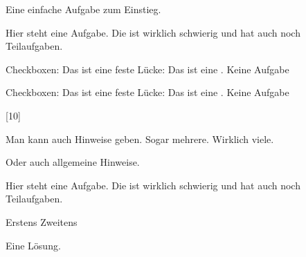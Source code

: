 \documentclass[a4paper]{scrartcl}
\begin{document}
    \begin{aufgabe}[points=2,bonus-points=1]
        Eine einfache Aufgabe zum Einstieg.
    \end{aufgabe}
    \begin{aufgabe}
        Hier steht eine Aufgabe. Die ist wirklich schwierig und hat auch noch Teilaufgaben.
        \begin{teilaufgaben}
            \teilaufgabe Checkboxen: \chb\chb\chb*\chb\chb*
            \teilaufgabe Das ist eine feste Lücke: \luecke[style=\uwave{#1}]{2cm}
            \teilaufgabe Das ist eine .
            \teilaufgabe Keine Aufgabe
        \end{teilaufgaben}
        \begin{loesung}
            \begin{teilaufgaben}
                \teilaufgabe Checkboxen: \chb\chb\chb*\chb\chb*
                \teilaufgabe Das ist eine feste Lücke: \luecke[style=\uwave{#1}]{2cm}
                \teilaufgabe Das ist eine .
                \teilaufgabe Keine Aufgabe
            \end{teilaufgaben}
        \end{loesung}
        [10]
        \begin{bearbeitungshinweis}
            \begin{teilaufgaben}
                \teilaufgabe Man kann auch Hinweise geben.
                \teilaufgabe Sogar mehrere.
                \teilaufgabeOhneLoesung
                \teilaufgabe Wirklich viele.
            \end{teilaufgaben}
            Oder auch allgemeine Hinweise.
        \end{bearbeitungshinweis}
    \end{aufgabe}

    \begin{aufgabe}
        \setzeSymbol{\symZweiSprechblasen}
        Hier steht eine Aufgabe. Die ist wirklich schwierig und hat auch noch Teilaufgaben.
        \begin{teilaufgaben}
            \teilaufgabe Erstens
            \teilaufgabe Zweitens
        \end{teilaufgaben}
        \begin{loesung}
            Eine Lösung.
        \end{loesung}
    \end{aufgabe}
\end{document}
